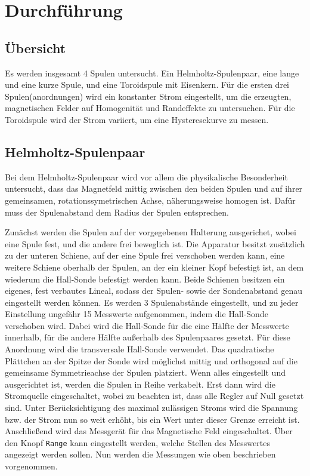 \section{Durchführung}
\label{sec:Durchführung}
\subsection{Übersicht}
Es werden insgesamt 4 Spulen untersucht. Ein Helmholtz-Spulenpaar, eine lange und eine kurze Spule, und eine Toroidspule mit Eisenkern.
Für die ersten drei Spulen(anordnungen) wird ein konstanter Strom eingestellt, um die erzeugten, magnetischen Felder auf Homogenität und Randeffekte zu untersuchen.
Für die Toroidspule wird der Strom variiert, um eine Hysteresekurve zu messen.

\subsection{Helmholtz-Spulenpaar}
Bei dem Helmholtz-Spulenpaar wird vor allem die physikalische Besonderheit untersucht, dass das Magnetfeld mittig zwischen den beiden Spulen und auf
ihrer gemeinsamen, rotationssymetrischen Achse, näherungsweise homogen ist. Dafür muss der Spulenabstand dem Radius der Spulen entsprechen.

Zunächst werden die Spulen auf der vorgegebenen Halterung ausgerichet, wobei eine Spule fest, und die andere frei beweglich ist. Die Apparatur besitzt zusätzlich zu der unteren Schiene, 
auf der eine Spule frei verschoben werden kann, eine weitere Schiene oberhalb der Spulen, an der ein kleiner Kopf befestigt ist, an dem wiederum die Hall-Sonde befestigt werden kann.
Beide Schienen besitzen ein eigenes, fest verbautes Lineal, sodass der Spulen- sowie der Sondenabstand genau eingestellt werden können.
Es werden 3 Spulenabstände eingestellt, und zu jeder Einstellung ungefähr 15 Messwerte aufgenommen, indem die Hall-Sonde verschoben wird. Dabei wird die Hall-Sonde für die eine Hälfte der Messwerte innerhalb,
für die andere Hälfte außerhalb des Spulenpaares gesetzt.
Für diese Anordnung wird die transversale Hall-Sonde verwendet. Das quadratische Plättchen an der Spitze der Sonde wird möglichst mittig und orthogonal auf die gemeinsame Symmetrieachse der Spulen platziert.
Wenn alles eingestellt und ausgerichtet ist, werden die Spulen in Reihe verkabelt. Erst dann wird die Stromquelle eingeschaltet, wobei zu beachten ist, dass alle Regler auf Null gesetzt sind.
Unter Berücksichtigung des maximal zulässigen Stroms wird die Spannung bzw. der Strom nun so weit erhöht, bis ein Wert unter dieser Grenze erreicht ist.
Anschließend wird das Messgerät für das Magnetische Feld eingeschaltet. Über den Knopf \texttt{Range} kann eingestellt werden, welche Stellen des Messwertes angezeigt werden sollen.
Nun werden die Messungen wie oben beschrieben vorgenommen.


